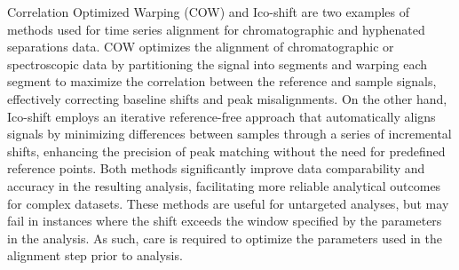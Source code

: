 \documentclass[preprint,12pt]{elsarticle}
\begin{document}
Correlation Optimized Warping (COW) \cite{tomasi2004correlation} and Ico-shift \cite{savorani2010icoshift} are two examples of methods used for time series alignment for chromatographic and hyphenated separations data. COW optimizes the alignment of chromatographic or spectroscopic data by partitioning the signal into segments and warping each segment to maximize the correlation between the reference and sample signals, effectively correcting baseline shifts and peak misalignments. On the other hand, Ico-shift employs an iterative reference-free approach that automatically aligns signals by minimizing differences between samples through a series of incremental shifts, enhancing the precision of peak matching without the need for predefined reference points. Both methods significantly improve data comparability and accuracy in the resulting analysis, facilitating more reliable analytical outcomes for complex datasets. These methods are useful for untargeted analyses, but may fail in instances where the shift exceeds the window specified by the parameters in the analysis. As such, care is required to optimize the parameters used in the alignment step prior to analysis.
\end{document}
